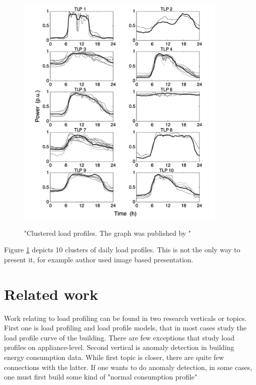 \documentclass[
11pt, %
english, %
singlespacing, %
headsepline, %
]{MastersDoctoralThesis} %
\begin{document}
\begin{figure}[H]
	\centering
	\caption{"Clustered load profiles. The graph was published by \protect\cite{GERBEC2005}"}
	\includegraphics[width=0.9\textwidth]{Figures/clustered_profiles.png}
	\label{fig:profiles}
\end{figure}

Figure \ref{fig:profiles} depicts 10 clusters of daily load profiles. 
This is not the only way to present it, for example author \cite{Park2019} used image based presentation.


\chapter{Related work}

Work relating to load profiling can be found in two research verticals or topics. First one is load profiling and load profile models, that in 
most cases study the load profile curve of the building. There are few exceptions that study load profiles on appliance-level.
Second vertical is anomaly detection in building energy consumption data. While first topic is closer, there are quite few connections with the latter. 
If one wants to do anomaly detection, in some cases, one must first build some kind of "normal consumption profile" 
\end{document}
